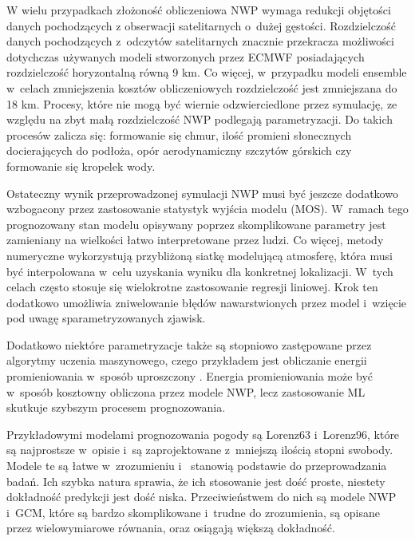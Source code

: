 W wielu przypadkach złożoność obliczeniowa NWP wymaga redukcji objętości danych pochodzących
z obserwacji satelitarnych o~dużej gęstości. Rozdzielczość danych pochodzących z~odczytów
satelitarnych znacznie przekracza możliwości dotychczas używanych modeli stworzonych przez
ECMWF posiadających rozdzielczość horyzontalną równą 9 km. Co więcej, w~przypadku modeli
ensemble w~celach zmniejszenia kosztów obliczeniowych rozdzielczość jest zmniejszana do 18 km.
Procesy, które nie mogą być wiernie odzwierciedlone przez symulację,
ze względu na zbyt małą rozdzielczość NWP podlegają parametryzacji.
Do takich procesów zalicza się: formowanie się chmur, ilość promieni słonecznych docierających do 
podłoża, opór aerodynamiczny szczytów górskich czy formowanie się kropelek wody.

Ostateczny wynik przeprowadzonej symulacji NWP musi być jeszcze dodatkowo wzbogacony przez zastosowanie
statystyk wyjścia modelu (MOS). W~ramach tego prognozowany stan modelu opisywany poprzez skomplikowane
parametry jest zamieniany na wielkości łatwo interpretowane przez ludzi. Co więcej, metody numeryczne
wykorzystują przybliżoną siatkę modelującą atmosferę, która musi być interpolowana w~celu uzyskania
wyniku dla konkretnej lokalizacji. W~tych celach często stosuje się wielokrotne zastosowanie 
regresji liniowej. Krok ten dodatkowo umożliwia zniwelowanie błędów nawarstwionych przez model i~wzięcie
pod uwagę sparametryzowanych zjawisk.

Dodatkowo niektóre parametryzacje także są stopniowo zastępowane przez algorytmy uczenia maszynowego,
czego przykładem jest obliczanie energii promieniowania w~sposób uproszczony
\cite{ai-in-weather-and-climate-prediction}. Energia promieniowania
może być w~sposób kosztowny obliczona przez modele NWP, lecz zastosowanie ML skutkuje szybszym
procesem prognozowania.

Przykładowymi modelami prognozowania pogody są Lorenz63 i~Lorenz96\cite{ai-in-weather-and-climate-prediction},
które są najprostsze w~opisie i~są zaprojektowane z~mniejszą ilością stopni swobody. Modele te są łatwe w~zrozumieniu i~
stanowią podstawie do przeprowadzania badań. Ich szybka natura sprawia, że ich stosowanie jest dość
proste, niestety dokładność predykcji jest dość niska. Przeciwieństwem do nich są modele NWP i~GCM,
które są bardzo skomplikowane i~trudne do zrozumienia, są opisane przez wielowymiarowe równania, oraz
osiągają większą dokładność.

